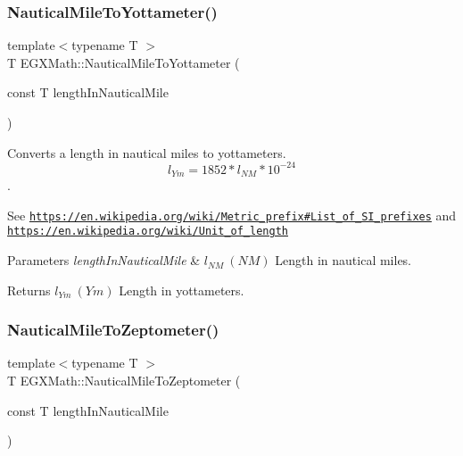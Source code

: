 \subsubsection{\texorpdfstring{Nautical\+Mile\+To\+Yottameter()}{NauticalMileToYottameter()}}
{\footnotesize\ttfamily template$<$typename T $>$ \\
T E\+G\+X\+Math\+::\+Nautical\+Mile\+To\+Yottameter (\begin{DoxyParamCaption}\item[{const T}]{length\+In\+Nautical\+Mile }\end{DoxyParamCaption})}



Converts a length in nautical miles to yottameters. \[ l_{Ym}=1852 * l_{NM} * 10^{-24} \]. 

See \href{https://en.wikipedia.org/wiki/Metric_prefix#List_of_SI_prefixes}{\tt https\+://en.\+wikipedia.\+org/wiki/\+Metric\+\_\+prefix\#\+List\+\_\+of\+\_\+\+S\+I\+\_\+prefixes} and \href{https://en.wikipedia.org/wiki/Unit_of_length}{\tt https\+://en.\+wikipedia.\+org/wiki/\+Unit\+\_\+of\+\_\+length} 
\begin{DoxyParams}{Parameters}
{\em length\+In\+Nautical\+Mile} & $ l_{NM}\ (NM)$ Length in nautical miles. \\
\hline
\end{DoxyParams}
\begin{DoxyReturn}{Returns}
$ l_{Ym}\ (Ym)$ Length in yottameters. 
\end{DoxyReturn}
\mbox{\label{group___e_g_x_math-_conversions-_length_conversions-_non-_s_i-_nautical_mile-_s_i_ga58ac712a2ae63b010c8480d380f2a7c6}} 
\subsubsection{\texorpdfstring{Nautical\+Mile\+To\+Zeptometer()}{NauticalMileToZeptometer()}}
{\footnotesize\ttfamily template$<$typename T $>$ \\
T E\+G\+X\+Math\+::\+Nautical\+Mile\+To\+Zeptometer (\begin{DoxyParamCaption}\item[{const T}]{length\+In\+Nautical\+Mile }\end{DoxyParamCaption})}



